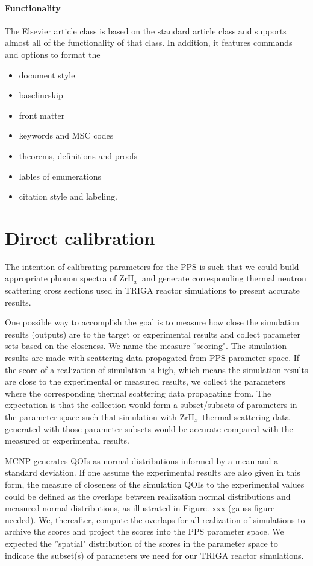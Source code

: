 \documentclass[review]{elsarticle}
\newcommand{\zh}{ZrH$_x$}
\begin{document}
\paragraph{Functionality} The Elsevier article class is based on the standard article class and supports almost all of the functionality of that class. In addition, it features commands and options to format the
\begin{itemize}
\item document style
\item baselineskip
\item front matter
\item keywords and MSC codes
\item theorems, definitions and proofs
\item lables of enumerations
\item citation style and labeling.
\end{itemize}

\section{Direct calibration}
The intention of calibrating parameters for the PPS is such that we could build appropriate phonon spectra of \zh~and generate corresponding thermal neutron scattering cross sections used in TRIGA reactor simulations to present accurate results. 

One possible way to accomplish the goal is to measure how close the simulation results (outputs) are to the target or experimental results and collect parameter sets based on the closeness. We name the measure ''scoring". The simulation results are made with scattering data propagated from PPS parameter space. If the score of a realization of simulation is high, which means the simulation results are close to the experimental or measured results, we collect the parameters where the corresponding thermal scattering data propagating from. The expectation is that the collection would form a subset/subsets of parameters in the parameter space such that simulation with \zh~thermal scattering data generated with those parameter subsets would be accurate compared with the measured or experimental results.

MCNP generates QOIs as normal distributions informed by a mean and a standard deviation. If one assume the experimental results are also given in this form, the measure of closeness of the simulation QOIs to the experimental values could be defined as the overlaps between realization normal distributions and measured normal distributions, as illustrated in Figure. xxx (gauss figure needed). We, thereafter, compute the overlaps for all realization of simulations to archive the scores and project the scores into the PPS parameter space. We expected the ''spatial" distribution of the scores in the parameter space to indicate the subset(s) of parameters we need for our TRIGA reactor simulations. %
\end{document}
